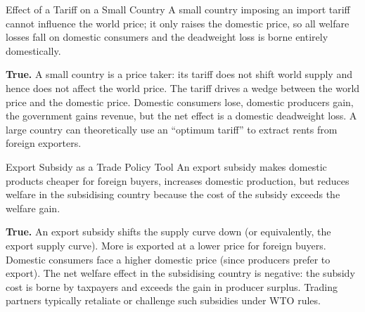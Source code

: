 \documentclass[paper=a5]{scrartcl}
\begin{document}
\begin{question}[type=tf]{Effect of a Tariff on a Small Country}
A small country imposing an import tariff cannot influence the world price;
it only raises the domestic price, so all welfare losses fall on domestic
consumers and the deadweight loss is borne entirely domestically.
\truefalse[true]
\begin{solution}
  \textbf{True.} A small country is a price taker: its tariff does not shift
  world supply and hence does not affect the world price. The tariff drives a
  wedge between the world price and the domestic price. Domestic consumers lose,
  domestic producers gain, the government gains revenue, but the net effect is a
  domestic deadweight loss. A large country can theoretically use an
  ``optimum tariff'' to extract rents from foreign exporters.
\end{solution}
\end{question}

\begin{question}[type=tf]{Export Subsidy as a Trade Policy Tool}
An export subsidy makes domestic products cheaper for foreign buyers,
increases domestic production, but reduces welfare in the subsidising country
because the cost of the subsidy exceeds the welfare gain.
\truefalse[true]
\begin{solution}
  \textbf{True.} An export subsidy shifts the supply curve down (or
  equivalently, the export supply curve). More is exported at a lower price for
  foreign buyers. Domestic consumers face a higher domestic price (since
  producers prefer to export). The net welfare effect in the subsidising country
  is negative: the subsidy cost is borne by taxpayers and exceeds the gain in
  producer surplus. Trading partners typically retaliate or challenge such
  subsidies under WTO rules.
\end{solution}
\end{question}
\end{document}
